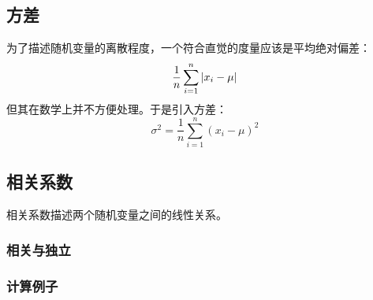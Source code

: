 \subsection{方差}
为了描述随机变量的离散程度，一个符合直觉的度量应该是平均绝对偏差：
\[
    \frac{1}{n} \sum_{i=1}^{n} \left|x_i - \mu\right|
\]
但其在数学上并不方便处理。于是引入方差：
\[
    \sigma^2 = \frac{1}{n} \sum_{i=1}^{n} (x_i - \mu)^2
\]
\subsection{相关系数}
相关系数描述两个随机变量之间的线性关系。
\subsubsection{相关与独立}
\subsubsection{计算例子}

